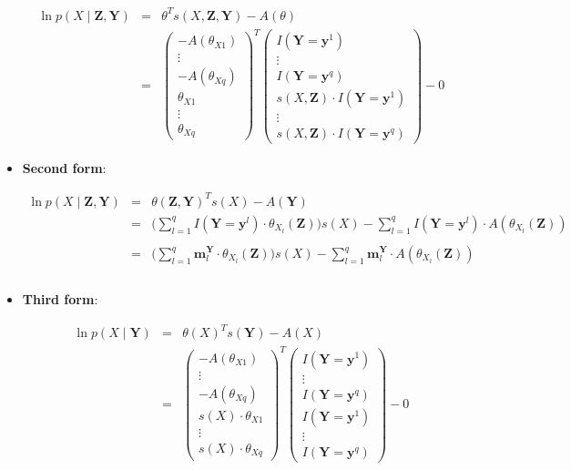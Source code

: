 \documentclass[11pt, oneside]{article}   	%
\newcommand{\bm}{\mathbf}
\numberwithin{figure}{section}
\numberwithin{equation}{section}
\numberwithin{table}{section}
\theoremstyle{definition}
\begin{document}
\begin{appendices}
\begin{itemize}
\begin{eqnarray*}
\ln p(X \mid \bm  Z, \mathbf{Y}) &=& \theta^T s(X,\bm Z, \mathbf{Y}) - A(\theta) \\
&=&
\begin{pmatrix}
- A(\theta_{X1}) \\
\vdots \\
- A(\theta_{Xq}) \\
\theta_{X1} \\
\vdots \\
\theta_{Xq}
\end{pmatrix}^T
\begin{pmatrix}
I(\mathbf{Y} =\mathbf{y}^1) \\
\vdots \\
I(\mathbf{Y} =\mathbf{y}^q) \\
s(X, \bm  Z) \cdot I(\mathbf{Y} =\mathbf{y}^1) \\
\vdots \\
s(X, \bm  Z) \cdot I(\mathbf{Y} =\mathbf{y}^q)
\end{pmatrix}
- 0 
\end{eqnarray*}

\item \textbf{Second form}:

\begin{eqnarray*}
\ln p(X \mid \bm  Z, \mathbf{Y} ) &=& \theta(\bm  Z, \mathbf{Y} )^T s(X) - A(\mathbf{Y} ) \\
&=&
\Big(\sum^q_{l=1} I(\mathbf{Y} =\mathbf{y}^l) \cdot \theta_{X_l}(\bm  Z) \Big)
s(X)
- \sum^q_{l=1} I(\mathbf{Y} =\mathbf{y}^l) \cdot A(\theta_{X_l}(\bm Z)) \\\\
&=&
\Big(\sum^q_{l=1} \mathbf{m}^\mathbf{Y}_l \cdot \theta_{X_l}(\bm  Z) \Big)
s(X)
- \sum^q_{l=1} \mathbf{m}^\mathbf{Y}_l \cdot A(\theta_{X_l}(\bm Z)) \\\\
\end{eqnarray*}

\item \textbf{Third form}:

\begin{eqnarray*}
\ln p(X \mid \mathbf{Y}) &=& \theta(X)^T s(\mathbf{Y}) - A(X) \\
&=&
\begin{pmatrix}
- A(\theta_{X1}) \\
\vdots \\
- A(\theta_{Xq})\\
s(X) \cdot \theta_{X1}\\
\vdots \\
s(X) \cdot \theta_{Xq}
\end{pmatrix}^T
\begin{pmatrix}
I(\mathbf{Y} =\mathbf{y}^1) \\
\vdots \\
I(\mathbf{Y} =\mathbf{y}^q) \\
I(\mathbf{Y} =\mathbf{y}^1) \\
\vdots \\
I(\mathbf{Y} =\mathbf{y}^q)
\end{pmatrix}
- 0
\end{eqnarray*}


\end{itemize}
\end{appendices}
\end{document}
